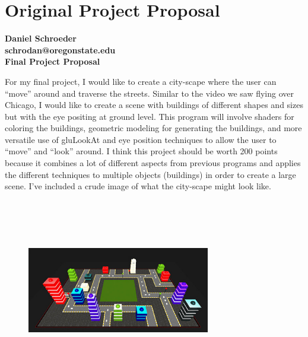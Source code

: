 \documentclass[journal,10pt,onecolumn,compsoc]{IEEEtran}
\begin{document}
\section{Original Project Proposal}
\noindent\textbf{Daniel Schroeder}\\
\textbf{schrodan@oregonstate.edu}\\
\textbf{Final Project Proposal}\\
\vspace{1.5cm}

For my final project, I would like to create a city-scape where the user can ``move'' around and traverse the streets. Similar to the video we saw flying over Chicago, I would like to create a scene with buildings of different shapes and sizes but with the eye positing at ground level. This program will involve shaders for coloring the buildings, geometric modeling for generating the buildings, and more versatile use of gluLookAt and eye position techniques to allow the user to ``move'' and ``look'' around.
I think this project should be worth 200 points because it combines a lot of different aspects from previous programs and applies the different techniques to multiple objects (buildings) in order to create a large scene. I've included a crude image of what the city-scape might look like.

\vspace{1.5cm}
\begin{center} 
\begin{figure}[H]
    \centering
    \includegraphics[width=8cm,height=8cm]{city.eps}
\end{figure}
\end{center}
\end{document}
